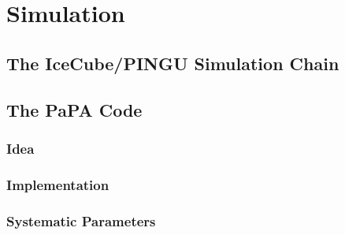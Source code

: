 \chapter{Simulation}
\label{sec:sim}


\section{The IceCube/PINGU Simulation Chain}
\label{sec:sim_MCchain}


\section{The PaPA Code}
\label{sec:papa}

\subsection{Idea}
\label{sec:sim_idea}


\subsection{Implementation}
\label{sec:papa_code}


\subsection{Systematic Parameters}
\label{sec:systematics}
